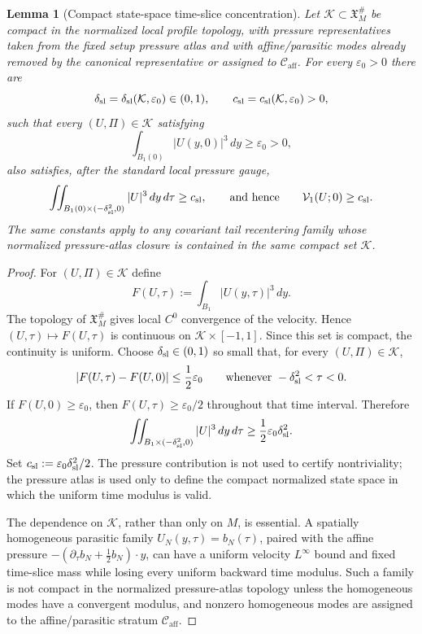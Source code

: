 \documentclass[11pt]{amsart}
\numberwithin{equation}{section}
\theoremstyle{plain}
\newtheorem{lemma}[lemma]{Lemma}
\theoremstyle{definition}
\theoremstyle{remark}
\newcommand{\eps}{\varepsilon}
\newcommand{\Vel}{\mathcal V}
\newcommand{\calK}{\mathcal K}
\newcommand{\Caff}{\mathcal C_{\mathrm{aff}}}
\begin{document}
\begin{lemma}[Compact state-space time-slice concentration]
\label{lem:timeslice-to-ckn-activity}
Let \(\calK\subset\mathfrak X_M^\#\) be compact in the normalized local
profile topology, with pressure representatives taken from the fixed setup
pressure atlas and with affine/parasitic modes already removed by the
canonical representative or assigned to \(\Caff\).  For every \(\eps_0>0\)
there are
\[
   \delta_{\rm sl}=\delta_{\rm sl}(\calK,\eps_0)\in(0,1),
   \qquad
   c_{\rm sl}=c_{\rm sl}(\calK,\eps_0)>0,
\]
such that every \((U,\Pi)\in\calK\) satisfying
\[
   \int_{B_1(0)}|U(y,0)|^3\,dy\ge\eps_0>0,
\]
also satisfies, after the standard local pressure gauge,
\[
   \iint_{B_1(0)\times(-\delta_{\rm sl}^2,0)} |U|^3\,dy\,d\tau
   \ge c_{\rm sl},
   \qquad\hbox{and hence}\qquad
   \Vel_1(U;0)\ge c_{\rm sl} .
\]
The same constants apply to any covariant tail recentering family whose
normalized pressure-atlas closure is contained in the same compact set
\(\calK\).
\end{lemma}

\begin{proof}
For \((U,\Pi)\in\calK\) define
\[
   F(U,\tau):=\int_{B_1}|U(y,\tau)|^3\,dy .
\]
The topology of \(\mathfrak X_M^\#\) gives local \(C^0\) convergence of the
velocity.  Hence \((U,\tau)\mapsto F(U,\tau)\) is continuous on
\(\calK\times[-1,1]\).  Since this set is compact, the continuity is uniform.
Choose \(\delta_{\rm sl}\in(0,1)\) so small that, for every
\((U,\Pi)\in\calK\),
\[
   |F(U,\tau)-F(U,0)|\le \frac12\eps_0
   \qquad\hbox{whenever } -\delta_{\rm sl}^2<\tau<0 .
\]
If \(F(U,0)\ge\eps_0\), then \(F(U,\tau)\ge\eps_0/2\) throughout that time
interval.  Therefore
\[
   \iint_{B_1\times(-\delta_{\rm sl}^2,0)}|U|^3\,dy\,d\tau
   \ge \frac12\eps_0\delta_{\rm sl}^2 .
\]
Set \(c_{\rm sl}:=\eps_0\delta_{\rm sl}^2/2\).  The pressure contribution is
not used to certify nontriviality; the pressure atlas is used only to define
the compact normalized state space in which the uniform time modulus is valid.

The dependence on \(\calK\), rather than only on \(M\), is essential.  A
spatially homogeneous parasitic family \(U_N(y,\tau)=b_N(\tau)\), paired with
the affine pressure
\(-(\partial_\tau b_N+\frac12 b_N)\cdot y\), can have a uniform velocity
\(L^\infty\) bound and fixed time-slice mass while losing every uniform
backward time modulus.  Such a family is not compact in the normalized
pressure-atlas topology unless the homogeneous modes have a convergent modulus,
and nonzero homogeneous modes are assigned to the affine/parasitic stratum
\(\Caff\).
\end{proof}
\end{document}

